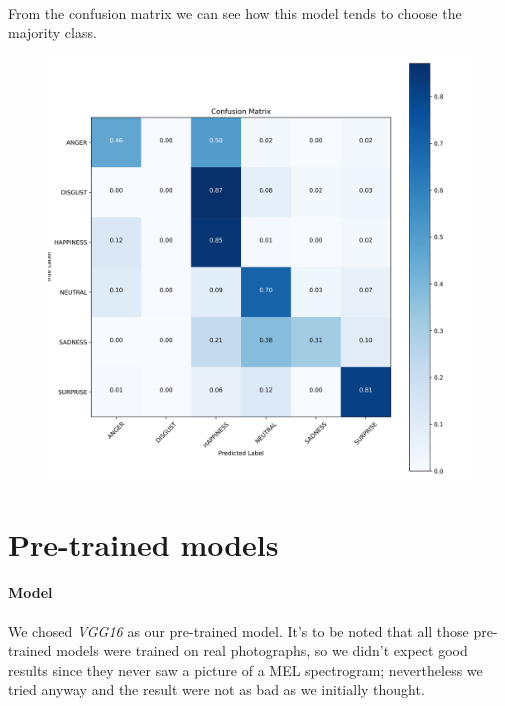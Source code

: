\paragraph{}
From the confusion matrix we can see how this model tends to choose the majority class.

\begin{figure}[H]
	\centering
	\includegraphics[width=.95\textwidth]{assets/results/preMELD.scratch/model.2dense.aug/confusion_matrix.png}
	
	\label{fig:cm4}
\end{figure}







\section{Pre-trained models}

\paragraph{Model}
We chosed \emph{VGG16} as our pre-trained model. It's to be noted that all those pre-trained models were trained on real photographs, so we didn't expect good results since they never saw a picture of a MEL spectrogram; nevertheless we tried anyway and the result were not as bad as we initially thought.

